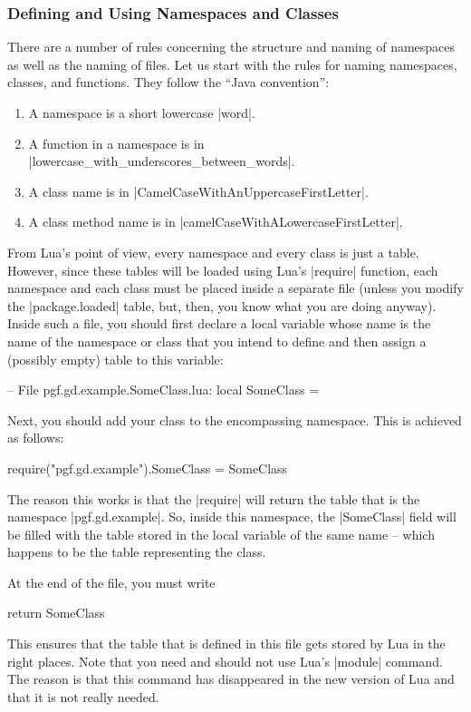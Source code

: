 \subsubsection{Defining and Using Namespaces and Classes}

There are a number of rules concerning the structure and naming of
namespaces as well as the naming of files. Let us start with the
rules for naming namespaces, classes, and functions. They follow the
``Java convention'':

\begin{enumerate}
\item A namespace is a short lowercase |word|.
\item A function in a namespace is in |lowercase_with_underscores_between_words|.
\item A class name is in |CamelCaseWithAnUppercaseFirstLetter|.
\item A class method name is in |camelCaseWithALowercaseFirstLetter|.
\end{enumerate}

From Lua's point of view, every namespace and every class is just a
table. However, since these tables will be loaded using Lua's
|require| function, each namespace and each class must be placed
inside a separate file (unless you modify the |package.loaded| table,
but, then, you know what you are doing anyway). Inside such a file, you
should first declare a local variable whose name is the name of the
namespace or class that you intend to define and then assign a
(possibly empty) table to this variable:
\begin{codeexample}[code only, tikz syntax=false]
-- File pgf.gd.example.SomeClass.lua:
local SomeClass = {}
\end{codeexample}
Next, you should add your class to the encompassing namespace. This is
achieved as follows:
\begin{codeexample}[code only, tikz syntax=false]
require("pgf.gd.example").SomeClass = SomeClass
\end{codeexample}
The reason this works is that the |require| will return the table that
is the namespace |pgf.gd.example|. So, inside this namespace, the
|SomeClass| field will be filled with the table stored in the local
variable of the same name -- which happens to be the table
representing the class.

At the end of the file, you must write
\begin{codeexample}[code only, tikz syntax=false]
return SomeClass  
\end{codeexample}
This ensures that the table that is defined in this file gets stored
by Lua in the right places. Note that you need and should not use
Lua's |module| command. The reason is that this command has
disappeared in the new version of Lua and that it is not really
needed. 

